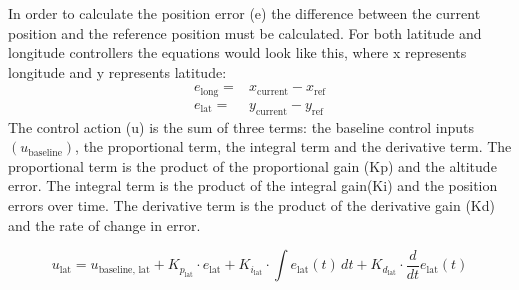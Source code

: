 \documentclass{article}
\begin{document}
In order to calculate the position error (e) the difference between the current
position and the reference position must be calculated. For both latitude and
longitude controllers the equations would look like this, where x represents
longitude and y represents latitude:
\begin{align}
  e_{\text{long}} =&  x_{\text{current}} - x_{\text{ref}}
  \\
  e_{\text{lat}} =&  y_{\text{current}} - y_{\text{ref}}
\end{align}
The control action (u) is the sum of three terms: the baseline control
inputs\((u_{\text{baseline}})\), the proportional term, the integral term and
the derivative term. The proportional term is the product of the proportional
gain (Kp) and the altitude error. The integral term is the product of the
integral gain(Ki) and the position errors over time. The derivative term is the
product of the derivative gain (Kd) and the rate of change in error.

\begin{equation}
  u_{\text{lat}} = u_{\text{baseline, lat}} + K_{p_{\text{lat}}} \cdot e_{\text{lat}} + K_{i_{\text{lat}}} \cdot \int e_{\text{lat}}(t) \, dt + K_{d_{\text{lat}}} \cdot \frac{d}{dt}e_{\text{lat}}(t)
\end{equation}
\end{document}
